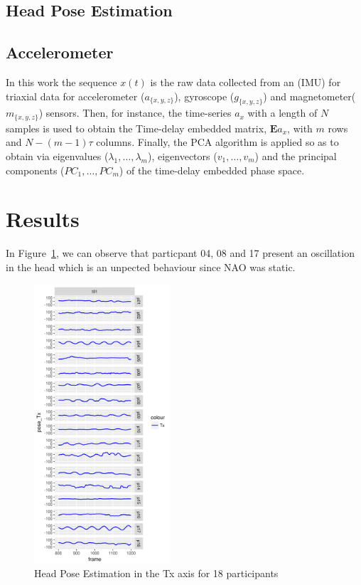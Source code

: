 \documentclass{sigchi}
\begin{document}
\subsection{Head Pose Estimation}



\subsection{Accelerometer}
In this work the sequence $x(t)$ is the raw data collected from an (IMU)
for triaxial data for accelerometer ($a_{ \{ x,y,z \} }$),
gyroscope ($g_{ \{ x,y,z \} }$) and magnetometer($m_{ \{ x,y,z \} }$) sensors.
Then, for instance, the time-series $a_x$ with a length of
$N$ samples is used to obtain the Time-delay embedded matrix,
$\boldsymbol{E} a_{x}$, with $m$ rows and $N-(m-1)\tau$ columns.
Finally, the PCA algorithm is applied so as to obtain via eigenvalues
($\lambda_1,\ldots,\lambda_m$), eigenvectors ($v_1,\ldots,v_m$) and
the principal components
($PC_1,\ldots,PC_m$) of the time-delay embedded phase space.




\section{Results}

In Figure~\ref{fig:pose}, we can observe that particpant 04, 08 and 17
present an oscillation in the head which is an unpected behaviour since
NAO was static.
\begin{figure}[!htb]
\centering
\includegraphics[width=0.45\textwidth]{figures/results/Tx}
\caption[PA]{Head Pose Estimation in the Tx axis for 18 participants}
\label{fig:pose}
\end{figure}
\end{document}
